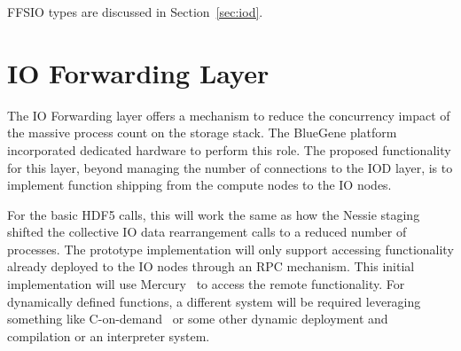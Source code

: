 \documentclass{sig-alt-gov2}
\begin{document}
%
%
FFSIO types are discussed in Section~\ref{sec:iod}.

\section{IO Forwarding Layer}
\label{sec:iof}

The IO Forwarding layer offers a mechanism to reduce the concurrency impact of
the massive process count on the storage stack.
The BlueGene platform
incorporated dedicated hardware to perform this role. The proposed
functionality for this layer, beyond managing the number of connections to the
IOD layer, is to implement function shipping from the compute nodes to the IO
nodes.

For the basic HDF5 calls, this will work the same as how the Nessie
staging~\cite{lofstead:2011:nessie-staging} shifted the collective IO data
rearrangement calls to a reduced number of processes. The prototype
implementation will only support accessing functionality already deployed to
the IO nodes through an RPC mechanism. This initial implementation will use
Mercury~\cite{Soumagne:2013:mercury} to access the remote functionality. For
dynamically defined functions, a different system will be required leveraging
something like C-on-demand~\cite{abbasi:2011:c-on-demand} or some other dynamic
deployment and compilation or an interpreter system.
\end{document}
